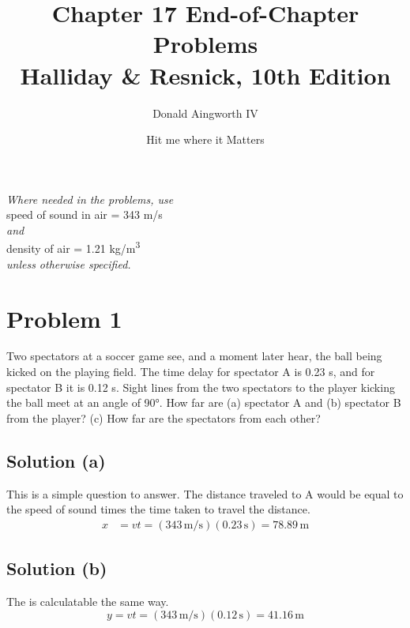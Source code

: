 \documentclass[12pt]{article}
\title{
    Chapter 17 End-of-Chapter Problems
    \\ \small
    Halliday \& Resnick, 10th Edition
}
\author{Donald Aingworth IV}
\date{\small Hit me where it Matters}
\begin{document}

    \maketitle

    \begin{center}
        \textit{Where needed in the problems, use}\\
        speed of sound in air = 343 m/s\\
        \textit{and}\\
        density of air = 1.21 \unit{\kilo\gram/\meter^3}\\
        \textit{unless otherwise specified.}
    \end{center}

    \pagebreak
    \section{Problem 1}
        Two spectators at a soccer game see, and a moment later hear, the ball being kicked on the playing field. 
        The time delay for spectator A is 0.23 s, and for spectator B it is 0.12 s. 
        Sight lines from the two spectators to the player kicking the ball meet at an angle of 90\unit{\degree}. 
        How far are (a) spectator A and (b) spectator B from the player?
        (c) How far are the spectators from each other?

        \subsection{Solution (a)}
            This is a simple question to answer.
            The distance traveled to A would be equal to the speed of sound times the time taken to travel the distance.
            \begin{align}
                x   &=  vt
                    =   (343\,\unit{\meter/\second})(0.23\,\unit{\second})
                    =   \boxed{78.89\,\unit{\meter}}
            \end{align}

        \subsection{Solution (b)}
            The is calculatable the same way.
            \begin{equation}
                y   =   vt
                    =   (343\,\unit{\meter/\second})(0.12\,\unit{\second})
                    =   \boxed{41.16\,\unit{\meter}}
            \end{equation}
\end{document}
